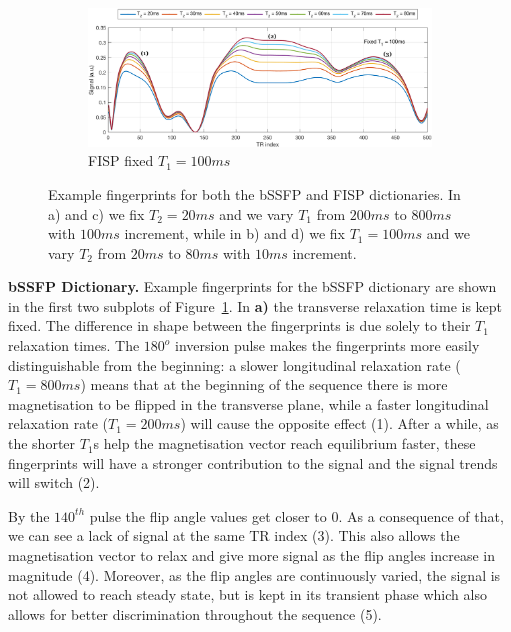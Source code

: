 \begin{figure}[ht]
    \begin{subfigure}[b]{.75\textwidth}
        \includegraphics[width=\textwidth]{images/mrf/mrfDictionaryFISPbDesc}
        \caption{FISP fixed $T_1 = 100ms$}
    \end{subfigure}
    
    \caption{Example fingerprints for both the bSSFP and FISP dictionaries. In a) and c) we fix $T_2 = 20ms$ and we vary $T_1$ from $200ms$ to $800ms$ with $100ms$ increment, while in b) and d) we fix $T_1 = 100ms$ and we vary $T_2$ from $20ms$ to $80ms$ with $10ms$ increment.}
    \label{fig:mrfDictionaries}
\end{figure}

\hfill

\textbf{bSSFP Dictionary.} 
Example fingerprints for the bSSFP dictionary are shown in the first two subplots of Figure~\ref{fig:mrfDictionaries}.
In \textbf{a)} the transverse relaxation time is kept fixed. 
The difference in shape between the fingerprints is due solely to their $T_1$ relaxation times.
The $180^o$ inversion pulse makes the fingerprints more easily distinguishable from the beginning:
a slower longitudinal relaxation rate ($T_1 = 800ms$) means that at the beginning of the sequence there is more magnetisation to be flipped in the transverse plane, while a faster longitudinal relaxation rate ($T_1 = 200ms$) will cause the opposite effect (1).
After a while, as the shorter $T_1$s help the magnetisation vector reach equilibrium faster, these fingerprints will have a stronger contribution to the signal and the signal trends will switch (2).

\hfill

By the $140^{th}$ pulse the flip angle values get closer to $0$. 
As a consequence of that, we can see a lack of signal at the same TR index (3).
This also allows the magnetisation vector to relax and give more signal as the flip angles increase in magnitude (4).
Moreover, as the flip angles are continuously varied, the signal is not allowed to reach steady state, but is kept in its transient phase which also allows for better discrimination throughout the sequence (5).

